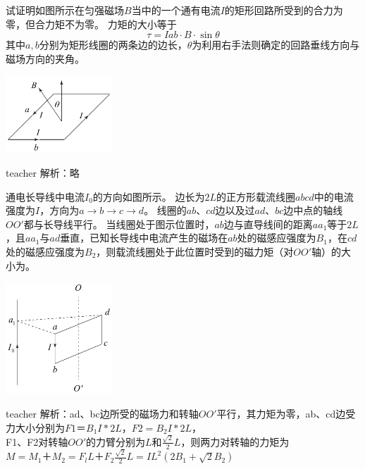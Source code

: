 \begin{example}
试证明如图所示在匀强磁场$B$当中的一个通有电流$I$的矩形回路所受到的合力为零，但合力矩不为零。
力矩的大小等于
\[\tau = Iab\cdot B\cdot \sin\theta\]
其中$a,b$分别为矩形线圈的两条边的边长，$\theta$为利用右手法则确定的回路垂线方向与磁场方向的夹角。
\begin{flushright}
\includegraphics[width = 0.3\textwidth]{images/mag-9.pdf} 
\end{flushright}
\begin{taggedblock}{teacher}
\noindent
解析：略
\end{taggedblock}
\end{example}



\begin{example}
通电长导线中电流$I_0$的方向如图所示。
边长为$2L$的正方形载流线圈$abcd$中的电流强度为$I$，方向为$a\rightarrow b\rightarrow c\rightarrow d$。
线圈的$ab、cd $边以及过$ad、bc$边中点的轴线$OO'$都与长导线平行。
当线圈处于图示位置时，$ ab $边与直导线间的距离$aa_1$等于$2L$，且$aa_1$与$ad$垂直，已知长导线中电流产生的磁场在$ab $处的磁感应强度为$B_1$，在$cd$处的磁感应强度为$B_2$，则载流线圈处于此位置时受到的磁力矩（对$OO'$轴）的大小为\kong\kong。
\begin{flushright}
\includegraphics[width = 0.3\textwidth]{images/mag-10.pdf} 
\end{flushright}


\begin{taggedblock}{teacher}
\noindent
解析：ad、bc边所受的磁场力和转轴$OO'$平行，其力矩为零，ab、cd边受力大小分别为$F1＝B_1I*2L$，$F2=B_2I*2L$，
\\F1、F2对转轴$OO'$的力臂分别为$L$和$\frac{\sqrt{2}}{2}L$，则两力对转轴的力矩为
\\$M=M_1＋M_2=F_lL＋F_2\frac{\sqrt{2}}{2}L=IL^2(2B_1+\sqrt{2}B_2)$
\end{taggedblock}
\end{example}



